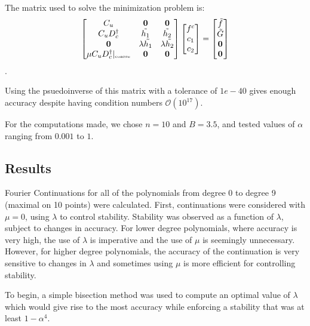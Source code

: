 \documentclass[11pt]{amsart}
\begin{document}
The matrix used to solve the minimization problem is:
\begin{equation}
\begin{bmatrix}
C_u & \mathbf{0} & \mathbf{0}\\
C_u D_c^{\dagger} & \tilde{h_1} & \tilde{h_2} \\
\mathbf{0} & \lambda \tilde{h_1} & \lambda \tilde{h_2} \\
\mu C_u D_c^{\dagger}|_{\text{\tiny{coarse}}} & \mathbf{0} & \mathbf{0}
\end{bmatrix}
\begin{bmatrix}
f^c \\
c_1\\
c_2
\end{bmatrix}
= 
\begin{bmatrix}
\tilde{f} \\
\tilde{G}\\
\mathbf{0}\\
\mathbf{0}
\end{bmatrix}
\end{equation}.  

Using the psuedoinverse of this matrix with a tolerance of $1e-40$ gives enough accuracy despite having condition numbers $\mathcal{O}(10^{17})$.  

For the computations made, we chose $n=10$ and $B=3.5$, and tested values of $\alpha$ ranging from $0.001$ to $1$.  


\subsection{Results} 
Fourier Continuations for all of the polynomials from degree 0 to degree 9 (maximal on 10 points) were calculated.  First, continuations were considered with $\mu=0$, using $\lambda$ to control stability. Stability was observed as a function of $\lambda$, subject to changes in accuracy.   For lower degree polynomials, where accuracy is very high, the use of $\lambda$ is imperative and the use of $\mu$ is seemingly unnecessary.  However, for higher degree polynomials, the accuracy of the continuation is very sensitive to changes in $\lambda$ and sometimes using $\mu$ is more efficient for controlling stability.  

To begin, a simple bisection method was used to compute an optimal value of $\lambda$ which would give rise to the most accuracy while enforcing a stability that was at least $1-\alpha^4$.  
\end{document}
